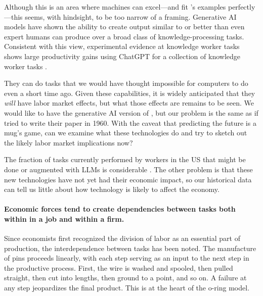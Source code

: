 \documentclass{article}
\begin{document}
Although this is an area where machines can excel---and fit \cite{bresnahan2020artificial}'s examples perfectly---this seems, with hindsight, to be too narrow of a framing.
Generative AI models have shown the ability to create output similar to or better than even expert humans can produce over a broad class of knowledge-processing tasks.  
Consistent with this view, experimental evidence at knowledge worker tasks shows large productivity gains using ChatGPT for a collection of knowledge worker tasks \citep{noy2023experimental}.

They can do tasks that we would have thought impossible for computers to do even a short time ago.
Given these capabilities, it is widely anticipated that they \emph{will} have labor market effects, but what those effects are remains to be seen. 
We would like to have the generative AI version of \cite{autor2003skill}, but our problem is the same as if \cite{autor2003skill} tried to write their paper in 1960.
With the caveat that predicting the future is a mug's game, can we examine what these technologies do and try to sketch out the likely labor market implications now? 

The fraction of tasks currently performed by workers in the US that might be done or augmented with LLMs is considerable \citep{eloundou2023gpts}.
The other problem is that these new technologies have not yet had their economic impact, so our historical data can tell us little about how technology is likely to affect the economy. 

\paragraph{Economic forces tend to create dependencies between tasks both within in a job and within a firm.}
Since economists first recognized the division of labor as an essential part of production, the interdependence between tasks has been noted.
The manufacture of pins proceeds linearly, with each step serving as an input to the next step in the productive process.
First, the wire is washed and spooled, then pulled straight, then cut into lengths, then ground to a point, and so on.
A failure at any step jeopardizes the final product. 
This is at the heart of the \cite{kremer1993} o-ring model.
\end{document}
